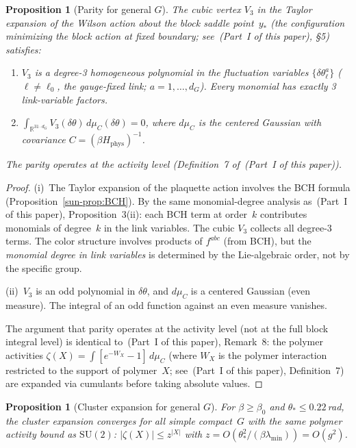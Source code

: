 \documentclass[11pt]{article}
\newtheorem{proposition}[theorem]{Proposition}
\theoremstyle{definition}
\newcommand{\SU}{\mathrm{SU}}
\newcommand{\R}{\mathbb{R}}
\begin{document}
\begin{proposition}[Parity for general $G$]
\label{sun-prop:parity}
The cubic vertex $V_3$ in the Taylor expansion of the
Wilson action about the block saddle point~$y_*$
(the configuration minimizing the block action at
fixed boundary; see~(Part~I of this paper), \S5) satisfies:
\begin{enumerate}[nosep,label=(\roman*)]
\item $V_3$ is a degree-3 homogeneous polynomial in the
fluctuation variables $\{\delta\theta_\ell^a\}$
($\ell\ne\ell_0$, the gauge-fixed link;
$a=1,\ldots,d_G$).
Every monomial has exactly 3 link-variable factors.
\item $\int_{\R^{31\cdot d_G}}V_3(\delta\theta)\,
d\mu_C(\delta\theta)=0$,
where $d\mu_C$ is the centered Gaussian with
covariance $C=(\beta H_{\mathrm{phys}})^{-1}$.
\end{enumerate}
The parity operates at the activity level
(Definition~7 of~\textup{(Part~I of this paper)}).
\end{proposition}

\begin{proof}
(i)~The Taylor expansion of the plaquette action
involves the BCH formula (Proposition~\ref{sun-prop:BCH}).
By the same monomial-degree analysis
as~(Part~I of this paper), Proposition~3(ii): each BCH term
at order~$k$ contributes monomials of degree~$k$
in the link variables.  The cubic $V_3$ collects all
degree-3 terms.  The color structure involves
products of $f^{abc}$ (from BCH), but the
\emph{monomial degree in link variables} is determined
by the Lie-algebraic order, not by the specific group.

(ii)~$V_3$ is an odd polynomial in $\delta\theta$,
and $d\mu_C$ is a centered Gaussian (even measure).
The integral of an odd function against an even measure
vanishes.

The argument that parity operates at the activity level
(not at the full block integral level) is identical
to~(Part~I of this paper), Remark~8: the polymer activities
$\zeta(X)=\int[e^{-W_X}-1]\,d\mu_C$ (where $W_X$ is the
polymer interaction restricted to the support of
polymer~$X$; see~(Part~I of this paper), Definition~7)
are expanded via
cumulants before taking absolute values.
\end{proof}

\begin{proposition}[Cluster expansion for general $G$]
\label{sun-prop:cluster}
For $\beta\ge\beta_0$ and $\theta_*\le 0.22$\,rad, the
cluster expansion converges for all simple compact~$G$
with the same polymer activity bound as $\SU(2)$:
$|\zeta(X)|\le z^{|X|}$ with
$z=O(\theta_*^2/(\beta\lambda_{\min}))=O(g^2)$.
\end{proposition}
\end{document}

